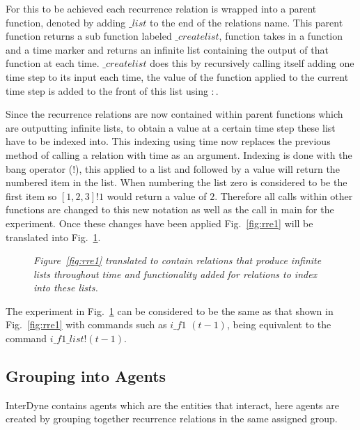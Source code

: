 \documentclass{article}
\begin{document}
For this to be achieved each recurrence relation is wrapped into a parent function, denoted by adding $\_list$ to the end of the relations name. This parent function returns a sub function labeled $\_createlist$, function takes in a function and a time marker and returns an infinite list containing the output of that function at each time. $\_createlist$ does this by recursively calling itself adding one time step to its input each time, the value of the function applied to the current time step is added to the front of this list using $:$.
 
Since the recurrence relations are now contained within parent functions which are outputting infinite lists, to obtain a value at a certain time step these list have to be indexed into. This indexing using time now replaces the previous method of calling a relation with time as an argument. Indexing is done with the bang operator ($!$), this applied to a list and followed by a value will return the numbered item in the list. When numbering the list zero is considered to be the first item so $[1,2,3]!1$ would return a value of $2$. Therefore all calls within other functions are changed to this new notation as well as the call in main for the experiment. Once these changes have been applied Fig.~\ref{fig:rre1} will be translated into Fig.~\ref{fig:ts1}.
\begin{figure}[H]
	\centering
	
	\caption{\it Figure~\ref{fig:rre1} translated to contain relations that produce infinite lists throughout time and functionality added for relations to index into these lists.}
	\label{fig:ts1}
\end{figure} 

The experiment in Fig.~\ref{fig:ts1} can be considered to be the same as that shown in Fig.~\ref{fig:rre1} with commands such as $i\_f1$ $(t-1)$, being equivalent to the command $i\_f1\_list ! (t-1)$.




\subsection{Grouping into Agents}
InterDyne contains agents which are the entities that interact, here agents are created by grouping together recurrence relations in the same assigned group.  
\end{document}
